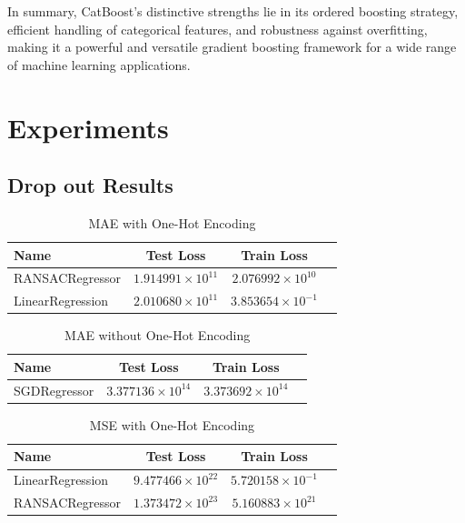 \documentclass[twocolumn]{article}
\begin{document}
In summary, CatBoost's distinctive strengths lie in its ordered boosting strategy, efficient handling of categorical features, and robustness against overfitting, making it a powerful and versatile gradient boosting framework for a wide range of machine learning applications.


\section{Experiments}
	\subsection{Drop out Results}

\begin{table}[h]
\centering
\caption{MAE with One-Hot Encoding}
\begin{tabular}{lccc}
\toprule
\textbf{Name} & \textbf{Test Loss} & \textbf{Train Loss} \\
\midrule
RANSACRegressor & $1.914991 \times 10^{11}$ & $2.076992 \times 10^{10}$ \\
LinearRegression & $2.010680 \times 10^{11}$ & $3.853654 \times 10^{-1}$ \\
\bottomrule
\end{tabular}
\end{table}

\begin{table}[h]
\centering
\caption{MAE without One-Hot Encoding}
\begin{tabular}{lccc}
\toprule
\textbf{Name} & \textbf{Test Loss} & \textbf{Train Loss} \\
\midrule
SGDRegressor & $3.377136 \times 10^{14}$ & $3.373692 \times 10^{14}$ \\
\bottomrule
\end{tabular}
\end{table}

\begin{table}[h]
\centering
\caption{MSE with One-Hot Encoding}
\begin{tabular}{lccc}
\toprule
\textbf{Name} & \textbf{Test Loss} & \textbf{Train Loss} \\
\midrule
LinearRegression & $9.477466 \times 10^{22}$ & $5.720158 \times 10^{-1}$ \\
RANSACRegressor & $1.373472 \times 10^{23}$ & $5.160883 \times 10^{21}$ \\
\bottomrule
\end{tabular}
\end{table}
\end{document}
